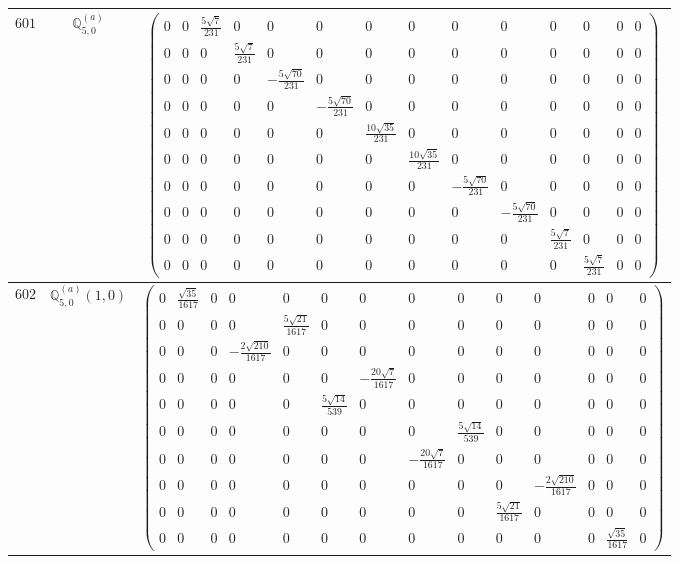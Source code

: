 \documentclass[fleqn,8pt,landscape]{jsarticle}
\begin{document}
\begin{center}
\begin{longtable}{ccc}
$ 601 $ & $ \mathbb{Q}_{5,0}^{(a)} $ & $ \begin{pmatrix} 0 & 0 & \frac{5 \sqrt{7}}{231} & 0 & 0 & 0 & 0 & 0 & 0 & 0 & 0 & 0 & 0 & 0 \\ 0 & 0 & 0 & \frac{5 \sqrt{7}}{231} & 0 & 0 & 0 & 0 & 0 & 0 & 0 & 0 & 0 & 0 \\ 0 & 0 & 0 & 0 & - \frac{5 \sqrt{70}}{231} & 0 & 0 & 0 & 0 & 0 & 0 & 0 & 0 & 0 \\ 0 & 0 & 0 & 0 & 0 & - \frac{5 \sqrt{70}}{231} & 0 & 0 & 0 & 0 & 0 & 0 & 0 & 0 \\ 0 & 0 & 0 & 0 & 0 & 0 & \frac{10 \sqrt{35}}{231} & 0 & 0 & 0 & 0 & 0 & 0 & 0 \\ 0 & 0 & 0 & 0 & 0 & 0 & 0 & \frac{10 \sqrt{35}}{231} & 0 & 0 & 0 & 0 & 0 & 0 \\ 0 & 0 & 0 & 0 & 0 & 0 & 0 & 0 & - \frac{5 \sqrt{70}}{231} & 0 & 0 & 0 & 0 & 0 \\ 0 & 0 & 0 & 0 & 0 & 0 & 0 & 0 & 0 & - \frac{5 \sqrt{70}}{231} & 0 & 0 & 0 & 0 \\ 0 & 0 & 0 & 0 & 0 & 0 & 0 & 0 & 0 & 0 & \frac{5 \sqrt{7}}{231} & 0 & 0 & 0 \\ 0 & 0 & 0 & 0 & 0 & 0 & 0 & 0 & 0 & 0 & 0 & \frac{5 \sqrt{7}}{231} & 0 & 0 \end{pmatrix} $ \\ \hline
$ 602 $ & $ \mathbb{Q}_{5,0}^{(a)}(1,0) $ & $ \begin{pmatrix} 0 & \frac{\sqrt{35}}{1617} & 0 & 0 & 0 & 0 & 0 & 0 & 0 & 0 & 0 & 0 & 0 & 0 \\ 0 & 0 & 0 & 0 & \frac{5 \sqrt{21}}{1617} & 0 & 0 & 0 & 0 & 0 & 0 & 0 & 0 & 0 \\ 0 & 0 & 0 & - \frac{2 \sqrt{210}}{1617} & 0 & 0 & 0 & 0 & 0 & 0 & 0 & 0 & 0 & 0 \\ 0 & 0 & 0 & 0 & 0 & 0 & - \frac{20 \sqrt{7}}{1617} & 0 & 0 & 0 & 0 & 0 & 0 & 0 \\ 0 & 0 & 0 & 0 & 0 & \frac{5 \sqrt{14}}{539} & 0 & 0 & 0 & 0 & 0 & 0 & 0 & 0 \\ 0 & 0 & 0 & 0 & 0 & 0 & 0 & 0 & \frac{5 \sqrt{14}}{539} & 0 & 0 & 0 & 0 & 0 \\ 0 & 0 & 0 & 0 & 0 & 0 & 0 & - \frac{20 \sqrt{7}}{1617} & 0 & 0 & 0 & 0 & 0 & 0 \\ 0 & 0 & 0 & 0 & 0 & 0 & 0 & 0 & 0 & 0 & - \frac{2 \sqrt{210}}{1617} & 0 & 0 & 0 \\ 0 & 0 & 0 & 0 & 0 & 0 & 0 & 0 & 0 & \frac{5 \sqrt{21}}{1617} & 0 & 0 & 0 & 0 \\ 0 & 0 & 0 & 0 & 0 & 0 & 0 & 0 & 0 & 0 & 0 & 0 & \frac{\sqrt{35}}{1617} & 0 \end{pmatrix} $ \\ \hline

\end{longtable}
\end{center}
\end{document}
